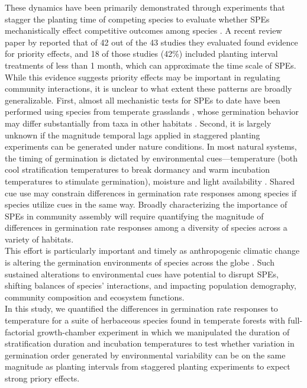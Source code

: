 \documentclass[11pt]{article}\usepackage[]{graphicx}\usepackage[]{color}
\begin{document}
\noindent These dynamics have been primarily demonstrated through experiments that stagger the planting time of competing species to evaluate whether SPEs mechanistically effect competitive outcomes among species \citep{Young:2017aa,Letten:2018aa}. A recent review paper by \citet{Weidlich:2020aa} reported that of 42 out of the 43 studies they evaluated found evidence for priority effects, and 18 of those studies (42\%) included planting interval treatments of less than 1 month, which can approximate the time scale of SPEs. \\

\noident While this evidence suggests priority effects may be important in regulating community interactions, it is unclear to what extent these patterns are broadly generalizable. First, almost all mechanistic tests for SPEs to date have been performed using species from temperate grasslands \citep{Weidlich:2020aa}, whose germination behavior may differ substantially from taxa in other habitats \citep{Tudela-Isanta:2018aa}. Second, it is largely unknown if the magnitude temporal lags applied in staggered planting experiments can be generated under nature conditions. In most natural systems, the timing of germination is dictated by environmental cues---temperature (both cool stratification temperatures to break dormancy and warm incubation temperatures to stimulate germination), moisture and light availability \citep{Bewley1997,Fenner2000}. Shared cue use may constrain differences in germination rate responses among species if species utilize cues in the same way. Broadly characterizing the importance of SPEs in community assembly will require quantifying the magnitude of differences in germination rate responses among a diversity of species across a variety of habitats.\\

\noindent This effort is particularly important and timely as anthropogenic climatic change is altering the germination environments of species across the globe \citep{Walck2011}.  Such sustained alterations to environmental cues have potential to disrupt SPEs, shifting balances of species' interactions, and impacting population demography, community composition and ecosystem functions.\\ 

In this study, we quantified the differences in germination rate responses to temperature for a suite of herbaceous species found in temperate forests with full-factorial growth-chamber experiment in which we manipulated the duration of stratification duration and incubation temperatures to test whether variation in germination order generated by environmental variability can be on the same magnitude as planting intervals from staggered planting experiments to expect strong priory effects.
\end{document}
